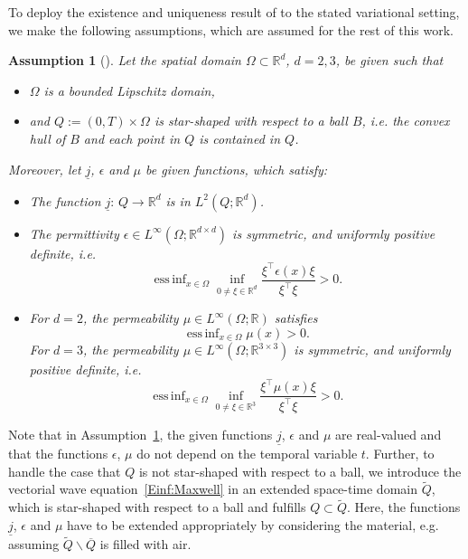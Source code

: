 \documentclass[a4paper,11pt]{article}
\newtheorem{assumption}[theorem]{Assumption}
\newcommand{\R}{\mathbb R}
\DeclareMathOperator*{\essinf}{ess\,inf}
\renewcommand{\vec}[1]{\underline{#1}}
\begin{document}
	
	To deploy the existence and uniqueness result of \cite{HauserOhm2023} to the stated variational setting, we make the following assumptions, which are assumed for the rest of this work.
	\begin{assumption}[{\cite[Assumption~1]{HauserOhm2023}}] \label{VF:Voraussetzung}
		Let the spatial domain $\Omega \subset \R^d$, $d=2,3$, be given such that
		\begin{itemize}
			\item $\Omega$ is a bounded Lipschitz domain,
			\item and $Q := (0,T) \times \Omega$ is star-shaped with respect to a ball $B$, i.e. the convex hull of $B$ and each point in $Q$ is contained in $Q$.
		\end{itemize}
		Moreover, let $\vec j$, $\epsilon$ and $\mu$ be given functions, which satisfy:
		\begin{itemize}
			\item The function $\vec j \colon \, Q \to \R^d$ is in $L^2(Q;\R^d)$.
			\item The permittivity $\epsilon \in L^\infty(\Omega; \R^{d \times d})$ is symmetric, and uniformly positive definite, i.e. 
			\begin{equation*}
				\essinf_{x\in \Omega} \inf_{0 \ne \xi\in \R^d} \frac{\xi^\top \epsilon(x) \xi}{\xi^\top\xi} > 0.
			\end{equation*}
			\item For $d=2$, the permeability $\mu\in L^\infty(\Omega;\R)$ satisfies 
			\begin{equation*}
				 \essinf_{x\in \Omega} \mu(x)  > 0.
			\end{equation*}
			For $d=3$, the permeability $\mu \in L^\infty(\Omega; \R^{3 \times 3})$  is symmetric, and uniformly positive definite, i.e. 
			\begin{equation*}
				 \essinf_{x\in \Omega} \inf_{0 \ne \xi\in \R^3} \frac{\xi^\top \mu(x) \xi}{\xi^\top\xi} > 0.
			\end{equation*}
		\end{itemize}
	\end{assumption}
	Note that in Assumption~\ref{VF:Voraussetzung}, the given functions $\vec j$, $\epsilon$ and $\mu$ are real-valued and that the functions $\epsilon$, $\mu$ do not depend on the temporal variable $t.$ 
	Further, to handle the case that $Q$ is not star-shaped with respect to a ball, we introduce the vectorial wave equation~\eqref{Einf:Maxwell} in an extended space-time domain $\widetilde Q$, which is star-shaped with respect to a ball and fulfills $Q \subset \widetilde Q$. Here, the functions $\vec j$, $\epsilon$ and $\mu$ have to be extended appropriately by considering the material, e.g. assuming $\widetilde Q\backslash \overline{Q}$ is filled with air.
\end{document}
